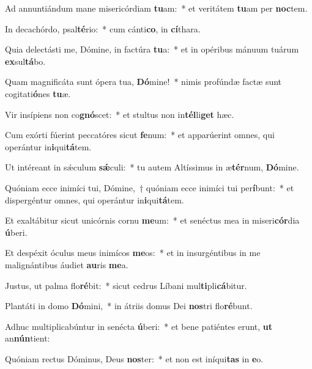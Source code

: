 \item Ad annuntiándum mane misericórdiam \textbf{tu}am:~* et veritátem \textbf{tu}am per \textbf{noc}tem.
\item In decachórdo, psal\textbf{té}rio:~* cum cánti\textbf{co}, in \textbf{cí}thara.
\item Quia delectásti me, Dómine, in factúra \textbf{tu}a:~* et in opéribus mánuum tuárum \textbf{ex}sul\textbf{tá}bo.
\item Quam magnificáta sunt ópera tua, \textbf{Dó}mine!~* nimis profúndæ factæ sunt cogitati\textbf{ó}nes \textbf{tu}æ.
\item Vir insípiens non co\textbf{gnó}scet:~* et stultus non in\textbf{tél}li\textbf{get} hæc.
\item Cum exórti fúerint peccatóres sicut \textbf{fe}num:~* et apparúerint omnes, qui operántur in\textbf{i}qui\textbf{tá}tem.
\item Ut intéreant in sǽculum \textbf{sǽ}culi:~* tu autem Altíssimus in æ\textbf{tér}num, \textbf{Dó}mine.
\item Quóniam ecce inimíci tui, Dómine,~† quóniam ecce inimíci tui per\textbf{í}bunt:~* et dispergéntur omnes, qui operántur in\textbf{i}qui\textbf{tá}tem.
\item Et exaltábitur sicut unicórnis cornu \textbf{me}um:~* et senéctus mea in miseri\textbf{cór}dia \textbf{ú}beri.
\item Et despéxit óculus meus inimícos \textbf{me}os:~* et in insurgéntibus in me malignántibus áudiet \textbf{au}ris \textbf{me}a.
\item Justus, ut palma flo\textbf{ré}bit:~* sicut cedrus Líbani mul\textbf{ti}pli\textbf{cá}bitur.
\item Plantáti in domo \textbf{Dó}mini,~* in átriis domus Dei \textbf{nos}tri flo\textbf{ré}bunt.
\item Adhuc multiplicabúntur in senécta \textbf{ú}beri:~* et bene patiéntes erunt, \textbf{ut} an\textbf{nún}tient:
\item Quóniam rectus Dóminus, Deus \textbf{nos}ter:~* et non est iníqui\textbf{tas} in \textbf{e}o.
